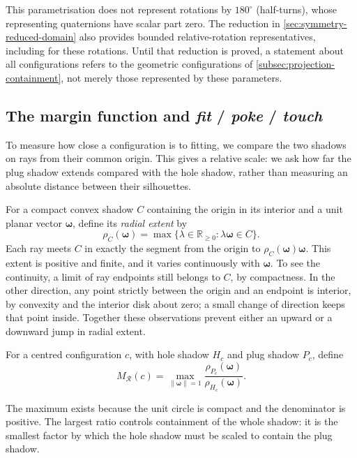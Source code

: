 This parametrisation does not represent rotations by $180^\circ$
(half-turns), whose representing quaternions have scalar part zero.
The reduction in \cref{sec:symmetry-reduced-domain} also provides bounded
relative-rotation representatives, including for these rotations.
Until that reduction is proved, a statement
about all configurations refers to the geometric configurations of
\cref{subsec:projection-containment}, not merely those represented by
these parameters.

\subsection{The margin function and \emph{fit} / \emph{poke} / \emph{touch}}\label{subsec:the-margin-function-and-fit-poke-touch}

To measure how close a configuration is to fitting, we compare the two
shadows on rays from their common origin. This gives a relative scale:
we ask how far the plug shadow extends compared with the hole shadow,
rather than measuring an absolute distance between their silhouettes.

For a compact convex shadow $C$ containing the origin in its interior and
a unit planar vector $\boldsymbol{\omega}$, define its \emph{radial extent} by
\[
  \rho_C(\boldsymbol{\omega})=\max\{\lambda\in\mathbb R_{\ge0}:\lambda\boldsymbol{\omega}\in C\}.
\]
Each ray meets $C$ in exactly the segment from the origin to
$\rho_C(\boldsymbol{\omega})\boldsymbol{\omega}$. This extent is positive and finite, and it varies
continuously with $\boldsymbol{\omega}$. To see the continuity, a limit of ray endpoints
still belongs to $C$, by compactness. In the other direction, any point
strictly between the origin and an endpoint is interior, by convexity and
the interior disk about zero; a small change of direction keeps that point
inside. Together these observations prevent either an upward or a downward
jump in radial extent.

\begin{definition}\label{def:configuration-margin}
  For a centred configuration $c$, with hole shadow $H_c$ and plug shadow
  $P_c$, define
  \begin{equation}\label{eq:configuration-margin}
    M_{\mathcal R}(c)=\max_{\lVert\boldsymbol{\omega}\rVert=1}
      \frac{\rho_{P_c}(\boldsymbol{\omega})}{\rho_{H_c}(\boldsymbol{\omega})}.
  \end{equation}
\end{definition}
The maximum exists because the unit circle is compact and the denominator
is positive. The largest ratio controls containment of the whole shadow:
it is the smallest factor by which the hole shadow must be scaled to
contain the plug shadow.

